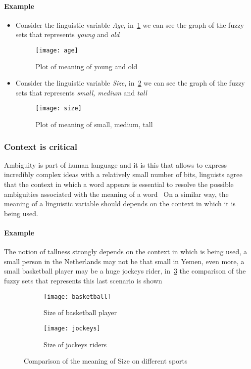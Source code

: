 \documentclass[]{article}
\begin{document}
\paragraph{Example}
\begin{itemize}
  \item Consider the linguistic variable \textit{Age}, in~\ref{fig:age} we can
    see the graph of the fuzzy sets that represents \textit{young} and
    \textit{old}
    \begin{figure}[ht!]
      \centering
      \texttt{[image: age]}
      \caption{Plot of meaning of young and old\label{fig:age}}
    \end{figure}
  \item Consider the linguistic variable \textit{Size}, in~\ref{fig:size} we can
    see the graph of the fuzzy sets that represents \textit{small, medium} and
    \textit{tall}
    \begin{figure}[ht!]
      \centering
      \texttt{[image: size]}
      \caption{Plot of meaning of small, medium, tall\label{fig:size}}
    \end{figure}
\end{itemize}

\subsubsection*{Context is critical}
Ambiguity is part of human language and it is this that allows to express
incredibly complex ideas with a relatively small number of bits, linguists
agree that the context in which a word appears is essential to resolve the
possible ambiguities associated with the meaning of a word~\citep{Bransford1972}
On a similar way, the meaning of a linguistic variable should depends on the
context in which it is being used.
\paragraph{Example}
The notion of tallness strongly depends on the context in which is being used, a
small person in the Netherlands may not be that small in Yemen, even more, a
small basketball player may be a huge jockeys rider, in~\ref{fig:context} the
comparison of the fuzzy sets that represents this last scenario is shown

\begin{figure}[ht!]
\centering
\begin{subfigure}{.5\textwidth}
  \centering
  \texttt{[image: basketball]}
  \caption{Size of basketball player}
\end{subfigure}%
\begin{subfigure}{.5\textwidth}
  \centering
  \texttt{[image: jockeys]}
  \caption{Size of jockeys riders}
\end{subfigure}
\caption{Comparison of the meaning of Size on different sports\label{fig:context}}
\end{figure}
\end{document}
